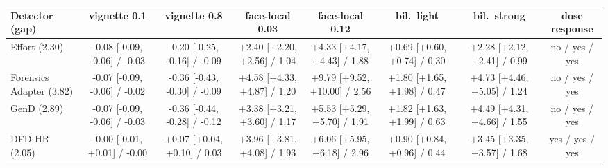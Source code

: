 \begin{tabular}{@{}l cccccc c@{}}
\toprule
Detector (gap) & vignette 0.1 & vignette 0.8 & face-local 0.03 & face-local 0.12 & bil.\ light & bil.\ strong & dose response \\
\midrule
Effort (2.30) & -0.08 [-0.09, -0.06] / -0.03 & -0.20 [-0.25, -0.16] / -0.09 & +2.40 [+2.20, +2.56] / 1.04 & +4.33 [+4.17, +4.43] / 1.88 & +0.69 [+0.60, +0.74] / 0.30 & +2.28 [+2.12, +2.41] / 0.99 & no / yes / yes \\
Forensics Adapter (3.82) & -0.07 [-0.09, -0.06] / -0.02 & -0.36 [-0.43, -0.30] / -0.09 & +4.58 [+4.33, +4.87] / 1.20 & +9.79 [+9.52, +10.00] / 2.56 & +1.80 [+1.65, +1.98] / 0.47 & +4.73 [+4.46, +5.05] / 1.24 & no / yes / yes \\
GenD (2.89) & -0.07 [-0.09, -0.06] / -0.03 & -0.36 [-0.44, -0.28] / -0.12 & +3.38 [+3.21, +3.60] / 1.17 & +5.53 [+5.29, +5.70] / 1.91 & +1.82 [+1.63, +1.99] / 0.63 & +4.49 [+4.31, +4.66] / 1.55 & no / yes / yes \\
DFD-HR (2.05) & -0.00 [-0.01, +0.01] / -0.00 & +0.07 [+0.04, +0.10] / 0.03 & +3.96 [+3.81, +4.08] / 1.93 & +6.06 [+5.95, +6.18] / 2.96 & +0.90 [+0.84, +0.96] / 0.44 & +3.45 [+3.35, +3.57] / 1.68 & yes / yes / yes \\
\bottomrule
\end{tabular}
